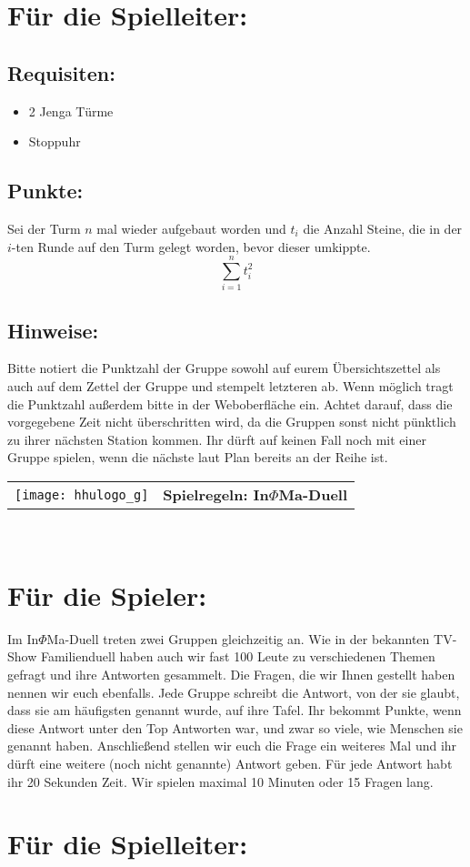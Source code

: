\documentclass[a4paper,10pt]{article}
\def\spield{In$\Phi $Ma-Duell}
\newcommand{\unten}{
 Bitte notiert die Punktzahl der Gruppe sowohl auf eurem Übersichtszettel als auch auf dem Zettel der Gruppe und stempelt letzteren ab. Wenn möglich tragt die Punktzahl außerdem bitte in der Weboberfläche ein.
 Achtet darauf, dass die vorgegebene Zeit nicht überschritten wird, da die Gruppen sonst nicht pünktlich zu ihrer nächsten Station kommen. Ihr dürft auf keinen Fall noch mit einer Gruppe spielen, wenn die nächste laut Plan bereits an der Reihe ist.
}
\begin{document}
\section*{Für die Spielleiter:}
\subsection*{Requisiten:}
\begin{itemize}
 \item 2 Jenga Türme
 \item Stoppuhr
\end{itemize}
\subsection*{Punkte:}
Sei der Turm $n$ mal wieder aufgebaut worden und $t_i$ die Anzahl Steine, die in der $i$-ten Runde auf den Turm gelegt worden, bevor dieser umkippte.
 $$\sum_{i=1}^{n}t_i^2$$

\subsection*{Hinweise:}
\unten

\newpage


  \begin{tabularx}{\textwidth}{lc}
    \texttt{[image: hhulogo\_g]}
  & {\Huge \textbf{Spielregeln: \spield}}
  \end{tabularx}\\

\Large
\section*{Für die Spieler:}
Im In$\Phi$Ma-Duell treten zwei Gruppen gleichzeitig an. Wie in der bekannten TV-Show Familienduell haben auch wir fast 100 Leute zu verschiedenen Themen gefragt und ihre Antworten gesammelt. Die Fragen, die wir Ihnen gestellt haben nennen wir euch ebenfalls. Jede Gruppe schreibt die Antwort, von der sie glaubt, dass sie am häufigsten genannt wurde, auf ihre Tafel. Ihr bekommt Punkte, wenn diese Antwort unter den Top Antworten war, und zwar so viele, wie Menschen sie genannt haben. Anschließend stellen wir euch die Frage ein weiteres Mal und ihr dürft eine weitere (noch nicht genannte) Antwort geben. Für jede Antwort habt ihr 20 Sekunden Zeit. Wir spielen maximal 10 Minuten oder 15 Fragen lang.

\section*{Für die Spielleiter:}
\end{document}
